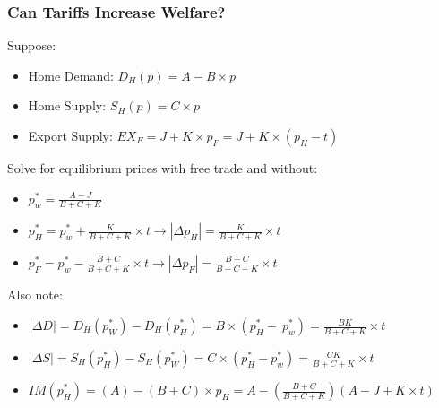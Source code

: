 \documentclass{beamer}
\begin{document}
\begin{frame}
	\frametitle{Can Tariffs Increase Welfare?}
\scriptsize
Suppose:
	\begin{itemize}
		\scriptsize
		\item Home Demand: $D_H(p) = A - B\times p$ 
		\item Home Supply: $S_H(p)  = C\times p$ 
		\item Export Supply: $EX_F = J + K\times p_F=J + K\times (p_H-t)$ 
\end{itemize}
		
Solve for equilibrium prices with free trade and without:
	\begin{itemize}
		\scriptsize
		\item $p^*_w=\frac{A-J}{B+C+K}$ 
		\item $p^*_H=p^*_w + \frac{K}{B+C+K}\times t \rightarrow |\Delta p_H| =\frac{K}{B+C+K}\times t $ 
		\item $p^*_F=p^*_w-\frac{B+C}{B+C+K}\times t  \rightarrow |\Delta p_F| =\frac{B+C}{B+C+K}\times t $ 
	\end{itemize}
Also note:
	\begin{itemize}
		\scriptsize
		\item $|\Delta D| = D_H(p^*_W) - D_H(p^*_H)  =B\times\left(p^*_H -\ p^*_w\right)= \frac{BK}{B+C+K}\times t$ 
		\item $|\Delta S|  = S_H(p^*_H) - S_H(p^*_W) =C\times\left(p^*_H - p^*_w\right)=\frac{CK}{B+C+K}\times t$
		\item $IM(p^*_H)=(A) - (B+C)\times p_H =A - \left(\frac{B+C}{B+C+K}\right)\left(A-J + K\times t\right)$
	\end{itemize}
\end{frame}
\end{document}

